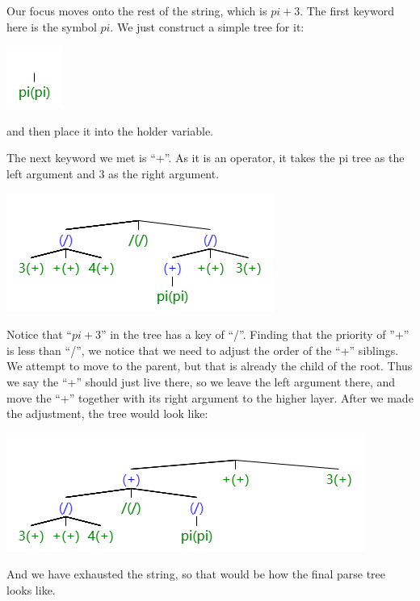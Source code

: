 \documentclass[11pt]{article}
\theoremstyle{definition}
\begin{document}
\begin{enumerate}
Our focus moves onto the rest of the string, which is $pi+3$. The first keyword here is the symbol $pi$. We just construct a simple tree for it: \begin{center}
\includegraphics[scale=0.7]{image7.png}
\end{center}
and then place it into the holder variable.

The next keyword we met is “+”. As it is an operator, it takes the pi tree as the left argument and 3 as the right argument.
\begin{center}
\includegraphics[scale=0.7]{image2.png}
\end{center}
Notice that “$pi+3$” in the tree has a key of “/”. Finding that the priority of ”$+$” is less than “/”, we notice that we need to adjust the order of the “+” siblings. We attempt to move to the parent, but that is already the child of the root. Thus we say the “+” should just live there, so we leave the left argument there, and move the “+” together with its right argument to the higher layer. After we made the adjustment, the tree would look like:
\begin{center}
\includegraphics[scale=0.7]{image3.png}
\end{center}
And we have exhausted the string, so that would be how the final parse tree looks like. \\


\end{enumerate}
\end{document}
